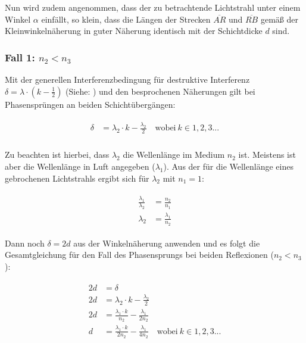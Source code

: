 Nun wird zudem angenommen, dass der zu betrachtende Lichtstrahl unter einem Winkel $\alpha$ einfällt, so klein, dass die Längen der Strecken $\overline{AR}$ und $\overline{RB}$ gemäß der Kleinwinkelnäherung \glqq in guter Näherung\grqq{} identisch mit der Schichtdicke $d$ sind.

\subsubsection{Fall 1: $n_2 < n_3$}

\noindent Mit der generellen Interferenzbedingung für destruktive Interferenz $\delta = \lambda \cdot (k - \frac{1}{2})$ (Siehe: ) und den besprochenen Näherungen gilt bei Phasensprüngen an beiden Schichtübergängen:

\begin{align}
\begin{split}
	\delta &= \lambda_2 \cdot k - \frac{\lambda_2}{2} \quad \text{wobei} \ k \in 1,2,3... \\
\end{split}
\end{align}

\noindent Zu beachten ist hierbei, dass $\lambda_2$ die Wellenlänge im Medium $n_2$ ist. Meistens ist aber die Wellenlänge in Luft angegeben ($\lambda_1$). Aus der  für die Wellenlänge eines gebrochenen Lichtstrahls ergibt sich für $\lambda_2$ mit $n_1 = 1$:

\begin{align}
\begin{split}
	\frac{\lambda_1}{\lambda_2} &= \frac{n_2}{n_1} \\
	\lambda_2 &= \frac{\lambda_1}{n_2}
\end{split}
\end{align}

\noindent Dann noch $\delta=2d$ aus der Winkelnäherung anwenden und es folgt die Gesamtgleichung für den Fall des Phasensprungs bei beiden Reflexionen ($n_2 < n_3$):

\begin{align}	\label{eq:duenneschichtfall1}
\begin{split}
	2d &= \delta \\
	2d &= \lambda_2 \cdot k - \frac{\lambda_2}{2} \\
	2d &= \frac{\lambda_1 \cdot k}{n_2} - \frac{\lambda_1}{2n_2} \\
	d  &= \frac{\lambda_1 \cdot k}{2n_2} - \frac{\lambda_1}{4n_2} \quad \text{wobei} \ k \in 1,2,3...
\end{split}
\end{align}

